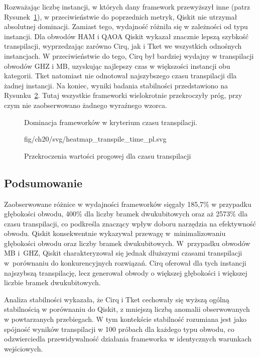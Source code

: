 Rozważając liczbę instancji, w których dany framework przewyższył inne (patrz Rysunek~\ref{fig:heatmap_time}), w przeciwieństwie do poprzednich metryk, Qiskit nie utrzymał absolutnej dominacji. Zamiast tego, wydajność różniła się w zależności od typu instancji. Dla obwodów HAM i QAOA Qiskit wykazał znacznie lepszą szybkość transpilacji, wyprzedzając zarówno Cirq, jak i Tket we wszystkich odnośnych instancjach.
W przeciwieństwie do tego, Cirq był bardziej wydajny w transpilacji obwodów GHZ i MB, uzyskując najlepszy czas w większości instancji obu kategorii. Tket natomiast nie odnotował najszybszego czasu transpilacji dla żadnej instancji.
Na koniec, wyniki badania stabilności przedstawiono na Rysunku~\ref{fig:threshold-exceedances_t}. Tutaj wszystkie frameworki wielokrotnie przekroczyły próg, przy czym nie zaobserwowano żadnego wyraźnego wzorca.


\begin{figure}
  \centering
  
  \caption{Dominacja frameworków w kryterium czasu transpilacji.}
  \label{fig:heatmap_time}
\end{figure}


\begin{figure}
\centering
      
{fig/ch20/svg/heatmap_transpile_time_pl.svg}
\caption{Przekroczenia wartości progowej dla czasu transpilacji}
\label{fig:threshold-exceedances_t}
\end{figure}


\subsection{Podsumowanie}

Zaobserwowane różnice w wydajności frameworków sięgały 185,7\% w przypadku głębokości obwodu, 400\% dla liczby bramek dwukubitowych oraz aż 2573\% dla czasu transpilacji, co podkreśla znaczący wpływ doboru narzędzia na efektywność obwodu. Qiskit konsekwentnie wykazywał przewagę w~minimalizowaniu głębokości obwodu oraz liczby bramek dwukubitowych. W~przypadku obwodów MB i~GHZ, Qiskit charakteryzował się jednak dłuższymi czasami transpilacji w~porównaniu do konkurencyjnych rozwiązań. Cirq oferował dla tych instancji najszybszą transpilację, lecz generował obwody o większej głębokości i większej liczbie bramek dwukubitowych.

Analiza stabilności wykazała, że Cirq i Tket cechowały się wyższą ogólną stabilnością w porównaniu do Qiskit, z mniejszą liczbą anomalii obserwowanych w powtarzanych przebiegach. W tym kontekście stabilność rozumiana jest jako spójność wyników transpilacji w 100 próbach dla każdego typu obwodu, co odzwierciedla przewidywalność działania frameworka w identycznych warunkach wejściowych.

